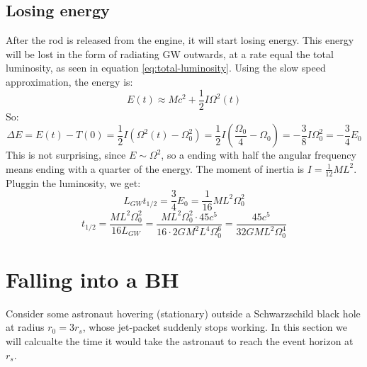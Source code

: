 \documentclass{article}
\begin{document}
\subsection{Losing energy}
After the rod is released from the engine, it will start losing energy. This energy will be lost in the form of radiating GW outwards, at a rate equal the total luminosity, as seen in equation \ref{eq:total-luminosity}. Using the slow speed approximation, the energy is:
\begin{equation}
    E(t) \approx Mc^2 + \frac{1}{2}I\Omega^2(t)
\end{equation}
So:
\begin{equation}
    \Delta E = E(t) - T(0) = \frac{1}{2}I(\Omega^2(t) - \Omega_0^2) = \frac{1}{2}I(\frac{\Omega_0}{4} - \Omega_0) = -\frac{3}{8}I\Omega_0^2 = -\frac{3}{4}E_0
\end{equation}
This is not surprising, since $E \sim \Omega^2$, so a ending with half the angular frequency means ending with a quarter of the energy. The moment of inertia is $I = \frac{1}{12}ML^2$. Pluggin the luminosity, we get:
\begin{equation}
    L_{GW}t_{1/2} = \frac{3}{4}E_0 = \frac{1}{16}ML^2\Omega_0^2
\end{equation}
\begin{equation}
    t_{1/2} = \frac{ML^2\Omega_0^2}{16L_{GW}} = 
    \frac{ML^2\Omega_0^2\cdot 45c^5}{16 \cdot 2G M^2 L^4\Omega_0^6} =
    \frac{45c^5}{32 G M L^2\Omega_0^4}
\end{equation}

\section{Falling into a BH}
Consider some astronaut hovering (stationary) outside a Schwarzschild black hole at radius $r_0 = 3r_s$, whose jet-packet suddenly stops working. In this section we will calcualte the time it would take the astronaut to reach the event horizon at $r_s$.
\end{document}
